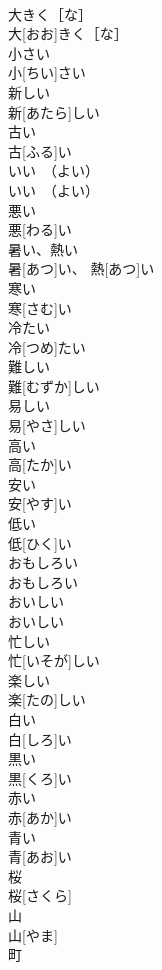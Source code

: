 \documentclass[8pt]{extreport}
\begin{document}
\begin{CJK}{UTF8}{min}
\\	大きく［な］	
\\	大[おお]きく［な］	
\\	小さい	
\\	小[ちい]さい	
\\	新しい	
\\	新[あたら]しい	
\\	古い	
\\	古[ふる]い	
\\	いい　（よい）	
\\	いい　（よい）	
\\	悪い	
\\	悪[わる]い	
\\	暑い、熱い	
\\	暑[あつ]い、 熱[あつ]い	
\\	寒い	
\\	寒[さむ]い	
\\	冷たい	
\\	冷[つめ]たい	
\\	難しい	
\\	難[むずか]しい	
\\	易しい	
\\	易[やさ]しい	
\\	高い	
\\	高[たか]い	
\\	安い	
\\	安[やす]い	
\\	低い	
\\	低[ひく]い	
\\	おもしろい	
\\	おもしろい	
\\	おいしい	
\\	おいしい	
\\	忙しい	
\\	忙[いそが]しい	
\\	楽しい	
\\	楽[たの]しい	
\\	白い	
\\	白[しろ]い	
\\	黒い	
\\	黒[くろ]い	
\\	赤い	
\\	赤[あか]い	
\\	青い	
\\	青[あお]い	
\\	桜	
\\	桜[さくら]	
\\	山	
\\	山[やま]	
\\	町	

\end{CJK}
\end{document}
